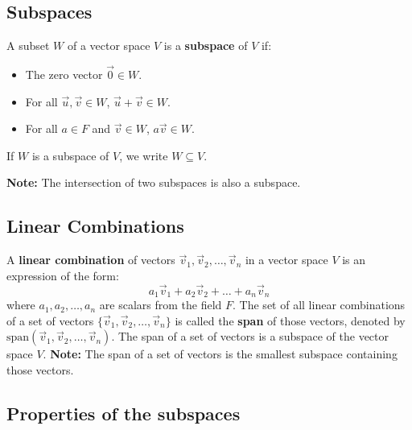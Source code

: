\subsection{Subspaces}

A subset \(W\) of a vector space \(V\) is a \textbf{subspace} of \(V\) if:
\begin{itemize}[label=\(-\)]

	\item The zero vector \(\vec{0} \in W\).
	\item For all \(\vec{u}, \vec{v} \in W\), \(\vec{u} + \vec{v} \in W\).
	\item For all \(a \in F\) and \(\vec{v} \in W\), \(a\vec{v} \in W\).
\end{itemize}
If \(W\) is a subspace of \(V\), we write \(W \subseteq V\).

\textbf{Note:} The intersection of two subspaces is also a subspace.

\subsection{Linear Combinations}

A \textbf{linear combination} of vectors \(\vec{v}_1, \vec{v}_2, \ldots, \vec{v}_n\) in a vector space \(V\) is an expression of
the form:
\[
	a_1\vec{v}_1 + a_2\vec{v}_2 + \ldots + a_n\vec{v}_n
\]
where \(a_1, a_2, \ldots, a_n\) are scalars from the field \(F\).
The set of all linear combinations of a set of vectors \(\{\vec{v}_1, \vec{v}_2, \ldots, \vec{v}_n\}\) is called the \textbf{span} of those vectors,
denoted by \(\text{span}(\vec{v}_1, \vec{v}_2, \ldots, \vec{v}_n)\).
The span of a set of vectors is a subspace of the vector space \(V\).
\textbf{Note:} The span of a set of vectors is the smallest subspace containing those vectors.

\subsection{Properties of the subspaces}

